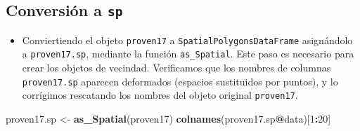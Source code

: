\documentclass[11pt,]{article}
\newenvironment{Shaded}{\begin{snugshade}}{\end{snugshade}}
\newcommand{\KeywordTok}[1]{\textcolor[rgb]{0.13,0.29,0.53}{\textbf{#1}}}
\newcommand{\DecValTok}[1]{\textcolor[rgb]{0.00,0.00,0.81}{#1}}
\newcommand{\StringTok}[1]{\textcolor[rgb]{0.31,0.60,0.02}{#1}}
\newcommand{\OperatorTok}[1]{\textcolor[rgb]{0.81,0.36,0.00}{\textbf{#1}}}
\newcommand{\NormalTok}[1]{#1}
\providecommand{\tightlist}{%
\setlength{\itemsep}{0pt}\setlength{\parskip}{0pt}}
\begin{document}
\subsection{\texorpdfstring{Conversión a
\texttt{sp}}{Conversión a sp}}\label{conversiuxf3n-a-sp}

\begin{itemize}
\tightlist
\item
  Conviertiendo el objeto \texttt{proven17} a
  \texttt{SpatialPolygonsDataFrame} asignándolo a \texttt{proven17.sp},
  mediante la función \texttt{as\_Spatial}. Este paso es necesario para
  crear los objetos de vecindad. Verificamos que los nombres de columnas
  \texttt{proven17.sp} aparecen deformados (espacios sustituidos por
  puntos), y lo corrígimos rescatando los nombres del objeto original
  \texttt{proven17}.
\end{itemize}

\begin{Shaded}
\begin{Highlighting}[]
\NormalTok{proven17.sp <-}\StringTok{ }\KeywordTok{as_Spatial}\NormalTok{(proven17)}
\KeywordTok{colnames}\NormalTok{(proven17.sp}\OperatorTok{@}\NormalTok{data)[}\DecValTok{1}\OperatorTok{:}\DecValTok{20}\NormalTok{]}
\end{Highlighting}
\end{Shaded}
\end{document}
